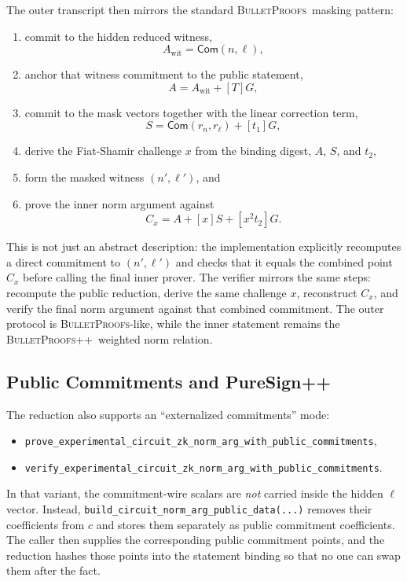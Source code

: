 \documentclass[11pt]{article}
\DeclareRobustCommand{\bp}{{\normalfont\scshape BulletProofs}}
\DeclareRobustCommand{\bppp}{{\normalfont\scshape BulletProofs++}}
\begin{document}
The outer transcript then mirrors the standard \bp\ masking pattern:
\begin{enumerate}
  \item commit to the hidden reduced witness,
  \[
  A_{\mathrm{wit}} = \mathsf{Com}(n,\ell),
  \]
  \item anchor that witness commitment to the public statement,
  \[
  A = A_{\mathrm{wit}} + [T]G,
  \]
  \item commit to the mask vectors together with the linear correction term,
  \[
  S = \mathsf{Com}(r_n,r_\ell) + [t_1]G,
  \]
  \item derive the Fiat-Shamir challenge $x$ from the binding digest, $A$, $S$, and $t_2$,
  \item form the masked witness $(n',\ell')$, and
  \item prove the inner norm argument against
  \[
  C_x = A + [x]S + [x^2 t_2]G.
  \]
\end{enumerate}

This is not just an abstract description: the implementation explicitly recomputes a direct
commitment to $(n',\ell')$ and checks that it equals the combined point $C_x$ before calling the
final inner prover. The verifier mirrors the same steps: recompute the public reduction, derive the
same challenge $x$, reconstruct $C_x$, and verify the final norm argument against that combined
commitment. The outer protocol is \bp-like, while the inner statement remains the
\bppp\ weighted norm relation.

\subsection{Public Commitments and PureSign++}

The reduction also supports an ``externalized commitments'' mode:
\begin{itemize}[nosep]
  \item \texttt{prove\_experimental\_circuit\_zk\_norm\_arg\_with\_public\_commitments},
  \item \texttt{verify\_experimental\_circuit\_zk\_norm\_arg\_with\_public\_commitments}.
\end{itemize}

In that variant, the commitment-wire scalars are \emph{not} carried inside the hidden
$\ell$ vector. Instead, \texttt{build\_circuit\_norm\_arg\_public\_data(...)} removes their
coefficients from $c$ and stores them separately as public commitment coefficients. The caller then
supplies the corresponding public commitment points, and the reduction hashes those points into the statement
binding so that no one can swap them after the fact.
\end{document}
